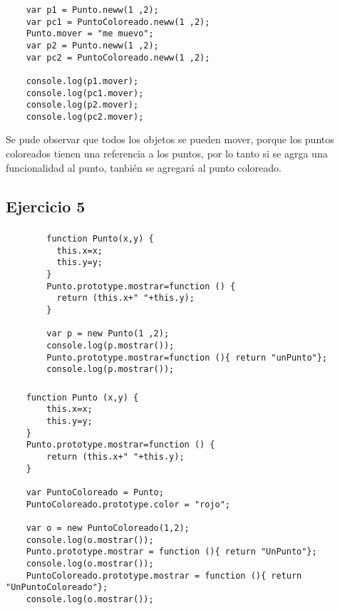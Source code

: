 \documentclass[10pt,a4paper]{article}
\begin{document}
\subsubsection{}
    \begin{lstlisting}
    var p1 = Punto.neww(1 ,2);
    var pc1 = PuntoColoreado.neww(1 ,2);
    Punto.mover = "me muevo";
    var p2 = Punto.neww(1 ,2);
    var pc2 = PuntoColoreado.neww(1 ,2);

    console.log(p1.mover);
    console.log(pc1.mover);
    console.log(p2.mover);
    console.log(pc2.mover);
    \end{lstlisting}
    Se pude observar que todos los objetos se pueden mover, porque los puntos coloreados tienen una referencia a los puntos, por lo tanto si se agrga una funcionalidad al punto, tanbién se agregará al punto coloreado.
    
\subsection{Ejercicio 5}
\subsubsection{}
    \begin{lstlisting}
        function Punto(x,y) {
          this.x=x;
          this.y=y;
        }
        Punto.prototype.mostrar=function () {
          return (this.x+" "+this.y);
        }

        var p = new Punto(1 ,2);
        console.log(p.mostrar());
        Punto.prototype.mostrar=function (){ return "unPunto"};
        console.log(p.mostrar());
    \end{lstlisting}    
\subsubsection{}
    \begin{lstlisting}
    function Punto (x,y) {
    	this.x=x;
    	this.y=y;
    }
    Punto.prototype.mostrar=function () {
    	return (this.x+" "+this.y);
    }
    
    var PuntoColoreado = Punto;
    PuntoColoreado.prototype.color = "rojo";

    var o = new PuntoColoreado(1,2);
    console.log(o.mostrar());
    Punto.prototype.mostrar = function (){ return "UnPunto"};
    console.log(o.mostrar());
    PuntoColoreado.prototype.mostrar = function (){ return "UnPuntoColoreado"};
    console.log(o.mostrar());
    \end{lstlisting}
\end{document}
